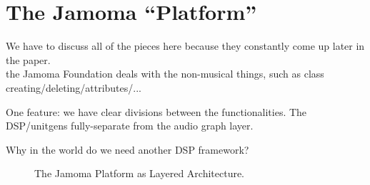 \documentclass[twoside,10pt]{article}
\begin{document}


\section{The Jamoma ``Platform''} %

We have to discuss all of the pieces here because they constantly come up later in the paper.\\

the Jamoma Foundation deals with the non-musical things, such as class creating/deleting/attributes/...

One feature: we have clear divisions between the functionalities.   The DSP/unitgens fully-separate from the audio graph layer.



Why in the world do we need another DSP framework?

%






\begin{figure}[htbp]
\centerline{}
\caption{The Jamoma Platform as Layered Architecture.}
\label{fig:layers}
\end{figure}
\end{document}
